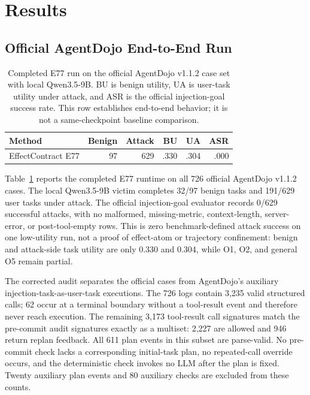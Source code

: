 \documentclass[letterpaper,twocolumn,10pt]{article}
\newcommand{\sys}{EffectContract}
\begin{document}
\section{Results}

\subsection{Official AgentDojo End-to-End Run}

\begin{table}[t]
\centering
\small
\caption{Completed E77 run on the official AgentDojo v1.1.2 case set with local Qwen3.5-9B. BU is benign utility, UA is user-task utility under attack, and ASR is the official injection-goal success rate. This row establishes end-to-end behavior; it is not a same-checkpoint baseline comparison.}
\label{tab:e77-agentdojo}
\begin{tabular}{lrrrrr}
\toprule
Method & Benign & Attack & BU & UA & ASR \\
\midrule
\sys{} E77 & 97 & 629 & .330 & .304 & .000 \\
\bottomrule
\end{tabular}
\end{table}
 
Table~\ref{tab:e77-agentdojo} reports the completed E77 runtime on all 726 official AgentDojo v1.1.2 cases. The local Qwen3.5-9B victim completes 32/97 benign tasks and 191/629 user tasks under attack. The official injection-goal evaluator records 0/629 successful attacks, with no malformed, missing-metric, context-length, server-error, or post-tool-empty rows. This is zero benchmark-defined attack success on one low-utility run, not a proof of effect-atom or trajectory confinement: benign and attack-side task utility are only 0.330 and 0.304, while O1, O2, and general O5 remain partial.

The corrected audit separates the official cases from AgentDojo's auxiliary injection-task-as-user-task executions. The 726 logs contain 3,235 valid structured calls; 62 occur at a terminal boundary without a tool-result event and therefore never reach execution. The remaining 3,173 tool-result call signatures match the pre-commit audit signatures exactly as a multiset: 2,227 are allowed and 946 return replan feedback. All 611 plan events in this subset are parse-valid. No pre-commit check lacks a corresponding initial-task plan, no repeated-call override occurs, and the deterministic check invokes no LLM after the plan is fixed. Twenty auxiliary plan events and 80 auxiliary checks are excluded from these counts.
\end{document}
